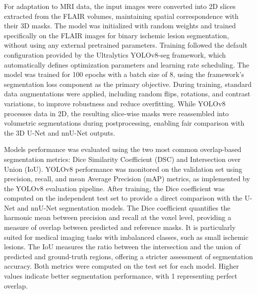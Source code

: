 \documentclass[12pt]{article}
\begin{document}
For adaptation to MRI data, the input images were converted into 2D slices extracted from the FLAIR volumes, maintaining spatial correspondence with their 3D masks. The model was initialized with random weights and trained specifically on the FLAIR images for binary ischemic lesion segmentation, without using any external pretrained parameters.
%
Training followed the default configuration provided by the Ultralytics YOLOv8-seg framework, which automatically defines optimization parameters and learning rate scheduling. The model was trained for 100 epochs with a batch size of 8, using the framework’s segmentation loss component as the primary objective.
%
During training, standard data augmentations were applied, including random flips, rotations, and contrast variations, to improve robustness and reduce overfitting.
%
While YOLOv8 processes data in 2D, the resulting slice-wise masks were reassembled into volumetric segmentations during postprocessing, enabling fair comparison with the 3D U-Net and nnU-Net outputs.


Models performance was evaluated using the two most common overlap-based segmentation metrics: Dice Similarity Coefficient (DSC) and Intersection over Union (IoU). YOLOv8 performance was monitored on the validation set using precision, recall, and mean Average Precision (mAP) metrics, as implemented by the YOLOv8 evaluation pipeline.
%
After training, the Dice coefficient was computed on the independent test set to provide a direct comparison with the U-Net and nnU-Net segmentation models.
The Dice coefficient quantifies the harmonic mean between precision and recall at the voxel level, providing a measure of overlap between predicted and reference masks. It is particularly suited for medical imaging tasks with imbalanced classes, such as small ischemic lesions. The IoU measures the ratio between the intersection and the union of predicted and ground-truth regions, offering a stricter assessment of segmentation accuracy.
%
Both metrics were computed on the test set for each model. Higher values indicate better segmentation performance, with 1 representing perfect overlap.

\end{document}
